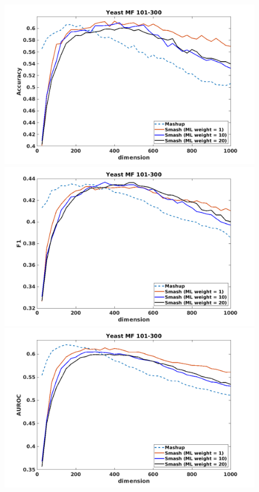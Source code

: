 \documentclass[12pt]{amsart}
\theoremstyle{remark}
\theoremstyle{definition}
\numberwithin{equation}{section} \numberwithin{table}{section}
\numberwithin{figure}{section}
\numberwithin{algorithm}{section}
\numberwithin{theorem}{section}
\begin{document}
\begin{figure}[h!]
	\centering
	\includegraphics[width=.8\linewidth]{Yeast-MF-101-300-Acc}  \\
	\includegraphics[width=.8\linewidth]{Yeast-MF-101-300-F1}  \\
	\includegraphics[width=.8\linewidth]{Yeast-MF-101-300-AUROC} 
\end{figure}
\end{document}
